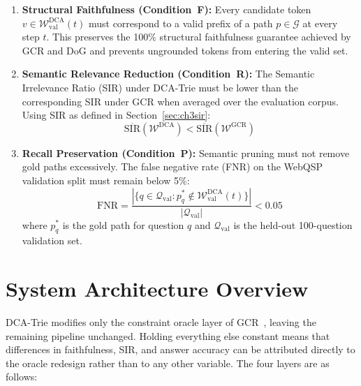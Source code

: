 \begin{enumerate}
  \item \textbf{Structural Faithfulness (Condition~F):} Every candidate token $v \in \mathcal{W}_{\text{val}}^{\text{DCA}}(t)$ must correspond to a valid prefix of a path $p \in \mathcal{G}$ at every step $t$. This preserves the 100\% structural faithfulness guarantee achieved by GCR and DoG and prevents ungrounded tokens from entering the valid set.

  \item \textbf{Semantic Relevance Reduction (Condition~R):} The Semantic Irrelevance Ratio (SIR) under DCA-Trie must be lower than the corresponding SIR under GCR when averaged over the evaluation corpus. Using SIR as defined in Section~\ref{sec:ch3sir}:
        \begin{equation}
          \overline{\text{SIR}}\!\left(\mathcal{W}^{\text{DCA}}\right) <
          \overline{\text{SIR}}\!\left(\mathcal{W}^{\text{GCR}}\right)
          \label{eq:sir_condition}
        \end{equation}

  \item \textbf{Recall Preservation (Condition~P):} Semantic pruning must not remove gold paths excessively. The false negative rate (FNR) on the WebQSP validation split must remain below 5\%:
        \begin{equation}
          \text{FNR} = \frac{|\{q \in \mathcal{Q}_{\text{val}} :
          p^*_q \notin \mathcal{W}_{\text{val}}^{\text{DCA}}(t)\}|}{|\mathcal{Q}_{\text{val}}|}
          < 0.05
          \label{eq:fnr}
        \end{equation}
        where $p^*_q$ is the gold path for question $q$ and $\mathcal{Q}_{\text{val}}$ is the held-out 100-question validation set.
\end{enumerate}


\section{System Architecture Overview}
\label{sec:ch3arch}

DCA-Trie modifies only the constraint oracle layer of GCR~\citep{luo2025-graph-constrained-reasoning}, leaving the remaining pipeline unchanged. Holding everything else constant means that differences in faithfulness, SIR, and answer accuracy can be attributed directly to the oracle redesign rather than to any other variable. The four layers are as follows:

